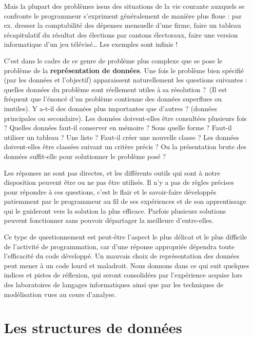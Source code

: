 Mais la plupart des problèmes issus des situations de la vie courante
auxquels se confronte le programmeur s’expriment généralement de
manière plus floue : par ex. dresser la comptabilité des dépenses
mensuelle d’une firme, faire un tableau récapitulatif du résultat des
élections par cantons électoraux, faire une version informatique d’un
jeu télévisé… Les exemples sont infinis !


C’est dans le cadre de ce genre de problème plus complexe que se pose le
problème de la \textbf{représentation de données}. Une fois le problème
bien spécifié (par les données et l’objectif) apparaissent
naturellement les questions suivantes : quelles données du problème
sont réellement utiles à sa résolution ?~(Il est fréquent que l’énoncé
d’un problème contienne des données superflues ou inutiles). Y a-t-il
des données plus importantes que d’autres ? (données principales ou
secondaire). Les données doivent-elles être consultées plusieurs fois ?
Quelles données faut-il conserver en mémoire ? Sous quelle forme ?
Faut-il utiliser un tableau ? Une liste ? Faut-il créer une nouvelle
classe ? Les données doivent-elles être classées suivant un critère
précis ? Ou la présentation brute des données suffit-elle pour
solutionner le problème posé ?

Les réponses ne sont pas directes, et les différents outils qui sont à
notre disposition peuvent être ou ne pas être utilisés. Il n’y a pas de
règles précises pour répondre à ces questions, c’est le flair et le
savoir-faire développés patiemment par le programmeur au fil de ses
expériences et de son apprentissage qui le guideront vers la solution
la plus efficace. Parfois plusieurs solutions peuvent fonctionner sans
pouvoir départager la meilleure d’entre-elles.

Ce type de questionnement est peut-être l’aspect le plus délicat et le
plus difficile de l’activité de programmation, car d’une réponse
appropriée dépendra toute l’efficacité du code développé. Un mauvais
choix de représentation des données peut mener à un code lourd et
maladroit. Nous donnons dans ce qui suit quelques indices et pistes de
réflexion, qui seront consolidées par l’expérience acquise lors des
laboratoires de langages informatiques ainsi que par les techniques de
modélisation vues au cours d’analyse.


\section{Les structures de données}

